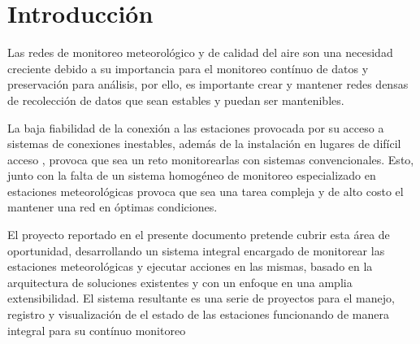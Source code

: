 \chapter*{Introducción}\label{introduccion}


Las redes de monitoreo meteorológico y de calidad del aire son una necesidad creciente debido a su importancia para el monitoreo contínuo de datos y preservación para análisis, por ello, es importante crear y mantener redes densas de recolección de datos que sean estables y puedan ser mantenibles.

La baja fiabilidad de la conexión a las estaciones provocada por su acceso a sistemas de conexiones inestables, además de la instalación en lugares de difícil acceso \cite{muller_sensors_and_the_city}, provoca que sea un reto monitorearlas con sistemas convencionales. Esto, junto con la falta de un sistema homogéneo de monitoreo especializado en estaciones meteorológicas provoca que sea una tarea compleja y de alto costo el mantener una red en óptimas condiciones.

El proyecto reportado en el presente documento pretende cubrir esta área de oportunidad, desarrollando un sistema integral encargado de monitorear las estaciones meteorológicas y ejecutar acciones en las mismas, basado en la arquitectura de soluciones existentes y con un enfoque en una amplia extensibilidad. El sistema resultante es una serie de proyectos para el manejo, registro y visualización de el estado de las estaciones funcionando de manera integral para su contínuo monitoreo


